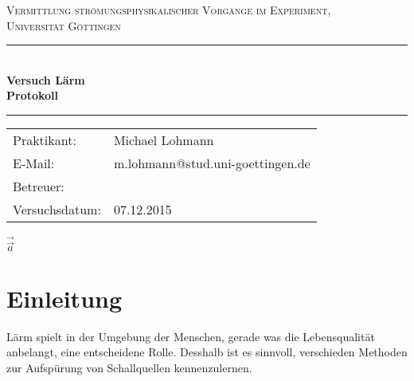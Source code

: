 \documentclass[12pt,a4paper,titlepage,headinclude,bibtotoc]{scrartcl}
\begin{document}
\begin{titlepage}
\centering
\textsc{\Large Vermittlung strömungsphysikalischer Vorgänge im Experiment,
\\[1.5ex] Universität Göttingen}

\vspace*{3cm}

\rule{\textwidth}{1pt}\\[0.5cm]
{\huge \bfseries
  Versuch Lärm  \\[1.5ex]
  Protokoll}\\[0.5cm]
\rule{\textwidth}{1pt}

\vspace*{3cm}

\begin{Large}
\begin{tabular}{ll}
Praktikant: &  Michael Lohmann\\
 E-Mail: & m.lohmann@stud.uni-goettingen.de\\
 Betreuer: & \\
 Versuchsdatum: & 07.12.2015\\
\end{tabular}
\end{Large}

\vspace*{0.8cm}

\begin{Large}
\end{Large}

\end{titlepage}

\tableofcontents

\newpage
$\vec\vec a$
\section{Einleitung}
\label{sec:einleitung}
Lärm spielt in der Umgebung der Menschen, gerade was die Lebensqualität anbelangt, eine entscheidene Rolle.
Desshalb ist es sinnvoll, verschieden Methoden zur Aufspürung von Schallquellen kennenzulernen.
\end{document}
